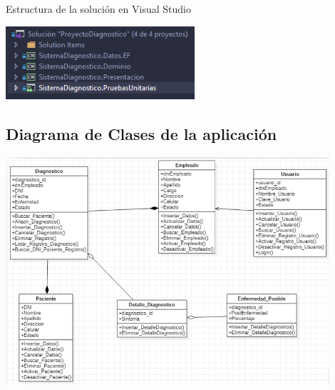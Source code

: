 \documentclass[preprint,12pt]{elsarticle}
\begin{document}
Estructura de la solución en Visual Studio

\begin{center}
	\includegraphics[width=7cm]{./imagen/Screenshot_1.png} 
\end{center}

\subsection{\textbf{ Diagrama de Clases de la aplicación }}
\begin{center}
	\includegraphics[width=12cm]{./imagen/diagrmclasesvistaprocesos} 
	
	\end{center}
\end{document}
